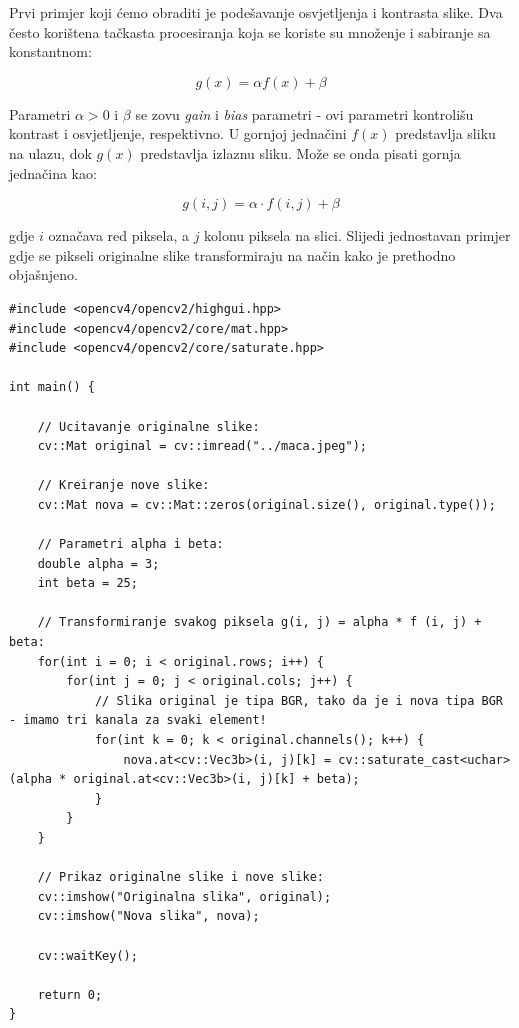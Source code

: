 \documentclass[a4paper, 12pt]{article}
\begin{document}
Prvi primjer koji ćemo obraditi je podešavanje osvjetljenja i kontrasta slike. Dva često korištena tačkasta procesiranja koja se koriste su množenje i sabiranje sa konstantnom:

\begin{equation*}
    g(x) = \alpha f(x) + \beta
\end{equation*}

Parametri $\alpha > 0$ i $\beta$ se zovu \textit{gain} i \textit{bias} parametri - ovi parametri kontrolišu kontrast i osvjetljenje, respektivno. U gornjoj jednačini $f(x)$ predstavlja sliku na ulazu, dok $g(x)$ predstavlja izlaznu sliku. Može se onda pisati gornja jednačina kao:

\begin{equation*}
    g(i, j) = \alpha \cdot f(i, j) + \beta
\end{equation*}

gdje $i$ označava red piksela, a $j$ kolonu piksela na slici. Slijedi jednostavan primjer gdje se pikseli originalne slike transformiraju na način kako je prethodno objašnjeno.

\begin{lstlisting}
#include <opencv4/opencv2/highgui.hpp>
#include <opencv4/opencv2/core/mat.hpp>
#include <opencv4/opencv2/core/saturate.hpp>

int main() {

    // Ucitavanje originalne slike:
    cv::Mat original = cv::imread("../maca.jpeg");

    // Kreiranje nove slike:
    cv::Mat nova = cv::Mat::zeros(original.size(), original.type());

    // Parametri alpha i beta:
    double alpha = 3;
    int beta = 25;

    // Transformiranje svakog piksela g(i, j) = alpha * f (i, j) + beta:
    for(int i = 0; i < original.rows; i++) {
        for(int j = 0; j < original.cols; j++) {
            // Slika original je tipa BGR, tako da je i nova tipa BGR - imamo tri kanala za svaki element!
            for(int k = 0; k < original.channels(); k++) {
                nova.at<cv::Vec3b>(i, j)[k] = cv::saturate_cast<uchar>(alpha * original.at<cv::Vec3b>(i, j)[k] + beta);
            }
        }
    }

    // Prikaz originalne slike i nove slike:
    cv::imshow("Originalna slika", original);
    cv::imshow("Nova slika", nova);

    cv::waitKey();

    return 0;
}
\end{lstlisting}
\end{document}
